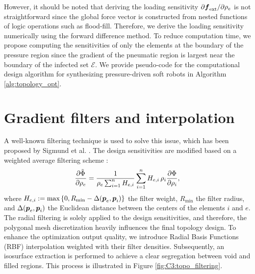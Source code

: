 \noindent However, it should be noted that deriving the loading sensitivity $\partial \boldsymbol{f}_{\textrm{ext}}/\partial \rho_e$ is not straightforward since the global force vector is constructed from nested functions of logic operations such as flood-fill. Therefore, we derive the loading sensitivity numerically using the forward difference method. To reduce computation time, we propose computing the sensitivities of only the elements at the boundary of the pressure region since the gradient of the pneumatic region is largest near the boundary of the infected set $\mathcal{E}$. We provide pseudo-code for the computational design algorithm for synthesizing pressure-driven soft robots in Algorithm \ref{alg:topology_opt}. 

\section{Gradient filters and interpolation}
A well-known filtering technique is used to solve this issue, which has been proposed by Sigmund et al. \cite{Bendsoe2003}. The design sensitivities are modified based on a weighted average filtering scheme \cite{Gain2013Dec,Bendsoe2003}:
%
\begin{equation}
\frac{\partial \tilde{\Phi}}{\partial {\rho_e}} = \frac{1}{\rho_e \sum^n_{i=1} H_{e,i}} \sum^n_{i=1} H_{e,i} \,\rho_i \frac{\partial {\Phi}}{\partial {\rho_i}},
\label{eq:C3:filters}
\end{equation}
%
where $H_{e,i} := \textrm{max} \left\{0, R_{\textrm{min}} - \Delta({\boldsymbol{p}}_e,{\boldsymbol{p}}_i)\right\}$ the filter weight, $R_{\textrm{min}}$ the filter radius, and $\Delta({\boldsymbol{p}}_e,{\boldsymbol{p}}_i)$ the Euclidean distance between the centers of the elements $i$ and $e$. The radial filtering is solely applied to the design sensitivities, and therefore, the polygonal mesh discretization heavily influences the final topology design. To enhance the optimization output quality, we introduce Radial Basis Functions (RBF) interpolation weighted with their filter densities. Subsequently, an isosurface extraction is performed to achieve a clear segregation between void and filled regions. This process is illustrated in Figure \ref{fig:C3:topo_filtering}.


